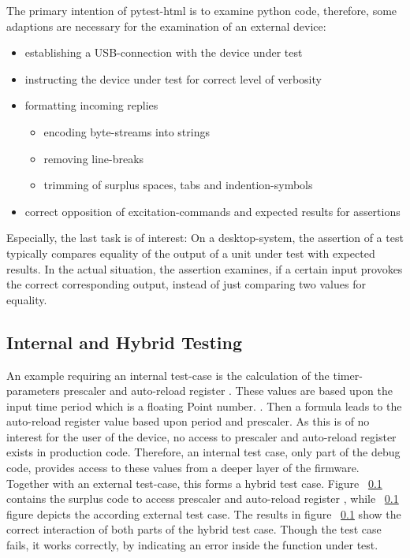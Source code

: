 			The primary intention of pytest-html is to examine python code, therefore, some adaptions are necessary for the examination of an external device: \\
				\begin{itemize} \setlength\itemsep{1px}
				\item establishing a USB-connection with the device under test
				\item instructing the device under test for correct level of verbosity
				\item formatting incoming replies 
					\begin{itemize} \setlength\itemsep{1px}
						\item encoding byte-streams into strings
						\item removing line-breaks
						\item trimming of surplus spaces, tabs and indention-symbols
					\end{itemize}
				\item correct opposition of excitation-commands and expected results for assertions \\
				\end{itemize}
			Especially, the last task is of interest: On a desktop-system, the assertion of a test typically compares equality of the output of a unit under test with expected results. In the actual situation, the assertion examines, if a certain input provokes the correct corresponding output, instead of just comparing two values for equality. \\
			
			
			\newcommand{\ARR}{auto-reload register }
			\subsection{Internal and Hybrid Testing}
			An example requiring an internal test-case is the calculation of  the timer-parameters prescaler and \ARR. These values are based upon the input time period which is a floating Point number. . Then a formula leads to the \ARR value based upon period and prescaler. As this is of no interest for the user of the device, no access to prescaler and \ARR exists in production code. Therefore, an internal test case, only part of the debug code, provides access to these values from a deeper layer of the firmware. Together with an external test-case, this forms a hybrid test case. Figure ~\ref{} contains the surplus code to access prescaler and \ARR, while ~\ref{} figure depicts the according external test case. The results in figure ~\ref{} show the correct interaction of both parts of the hybrid test case. Though the test case fails, it works correctly, by indicating an error inside the function under test. 
			
